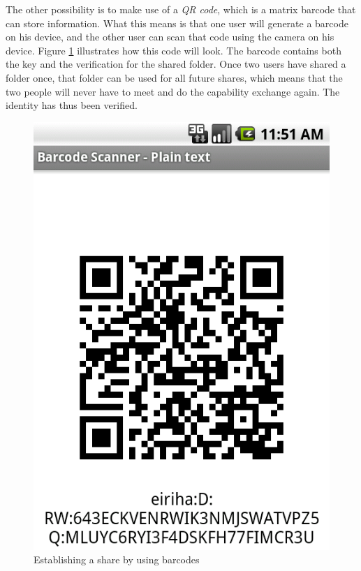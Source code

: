 \documentclass[pdftex,english,10pt,b5paper,twoside]{book}
\begin{document}
The other possibility is to make use of a \emph{\ac{QR} code}, which is a matrix
barcode that can store information. What this means is that one user will
generate a barcode on his device, and the other user can scan that code using
the camera on his device. Figure \ref{fig:CSVAndroid:barcode} illustrates how
this code will look. The barcode contains both the key and the verification for
the shared folder. Once two users have shared a folder once, that folder can be
used for all future shares, which means that the two people will never have to
meet and do the capability exchange again. The identity has thus been verified.

\begin{figure}[h!]
    \centering
    \includegraphics[scale=0.4]{client-barcode.png}
    \caption{Establishing a share by using barcodes}
    \label{fig:CSVAndroid:barcode}
\end{figure}
\end{document}
